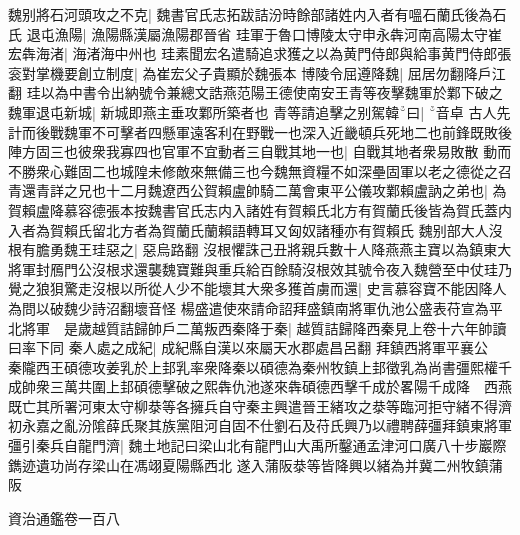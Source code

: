 魏别將石河頭攻之不克|{
	魏書官氏志拓跋詰汾時餘部諸姓内入者有嗢石蘭氏後為石氏}
退屯漁陽|{
	漁陽縣漢屬漁陽郡晉省}
珪軍于魯口博陵太守申永犇河南高陽太守崔宏犇海渚|{
	海渚海中州也}
珪素聞宏名遣騎追求獲之以為黄門侍郎與給事黄門侍郎張衮對掌機要創立制度|{
	為崔宏父子貴顯於魏張本}
博陵令屈遵降魏|{
	屈居勿翻降戶江翻}
珪以為中書令出納號令兼總文誥燕范陽王德使南安王青等夜擊魏軍於鄴下破之魏軍退屯新城|{
	新城即燕主垂攻鄴所築者也}
青等請追擊之别駕韓曰|{
	音卓}
古人先計而後戰魏軍不可擊者四懸軍遠客利在野戰一也深入近畿頓兵死地二也前鋒既敗後陣方固三也彼衆我寡四也官軍不宜動者三自戰其地一也|{
	自戰其地者衆易敗散}
動而不勝衆心難固二也城隍未修敵來無備三也今魏無資糧不如深壘固軍以老之德從之召青還青詳之兄也十二月魏遼西公賀賴盧帥騎二萬會東平公儀攻鄴賴盧訥之弟也|{
	為賀賴盧降慕容德張本按魏書官氏志内入諸姓有賀賴氏北方有賀蘭氏後皆為賀氏蓋内入者為賀賴氏留北方者為賀蘭氏蘭賴語轉耳又匈奴諸種亦有賀賴氏}
魏别部大人沒根有膽勇魏王珪惡之|{
	惡烏路翻}
沒根懼誅己丑將親兵數十人降燕燕主寶以為鎮東大將軍封鴈門公沒根求還襲魏寶難與重兵給百餘騎沒根效其號令夜入魏營至中仗珪乃覺之狼狽驚走沒根以所從人少不能壞其大衆多獲首虜而還|{
	史言慕容寶不能因降人為問以破魏少詩沼翻壞音怪}
楊盛遣使來請命詔拜盛鎮南將軍仇池公盛表苻宣為平北將軍　是歲越質詰歸帥戶二萬叛西秦降于秦|{
	越質詰歸降西秦見上卷十六年帥讀曰率下同}
秦人處之成紀|{
	成紀縣自漢以來屬天水郡處昌呂翻}
拜鎮西將軍平襄公　秦隴西王碩德攻姜乳於上邽乳率衆降秦以碩德為秦州牧鎮上邽徵乳為尚書彊熙權千成帥衆三萬共圍上邽碩德擊破之熙犇仇池遂來犇碩德西擊千成於畧陽千成降　西燕既亡其所署河東太守柳㳟等各擁兵自守秦主興遣晉王緒攻之㳟等臨河拒守緒不得濟初永嘉之亂汾隂薛氏聚其族黨阻河自固不仕劉石及苻氏興乃以禮聘薛彊拜鎮東將軍彊引秦兵自龍門濟|{
	魏土地記曰梁山北有龍門山大禹所鑿通孟津河口廣八十步巖際鐫迹遺功尚存梁山在馮翊夏陽縣西北}
遂入蒲阪㳟等皆降興以緒為并冀二州牧鎮蒲阪

資治通鑑卷一百八
